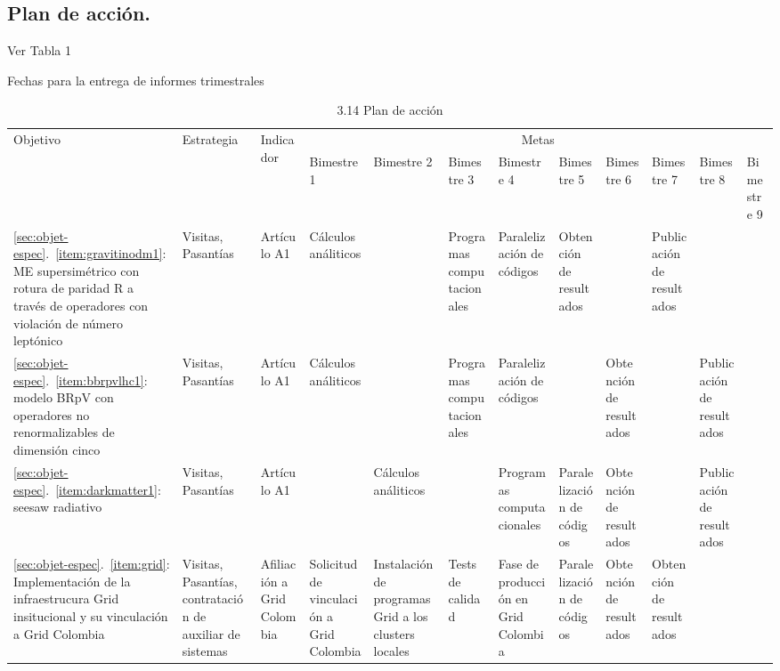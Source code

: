 \subsection{Plan de acción.}
Ver Tabla 1
\begin{evaluacion}
  Fechas para la entrega de informes trimestrales
\end{evaluacion}
\begin{sidewaystable}[htdp]
\footnotesize
\caption{3.14 Plan de acción}  %
\centering
\begin{tabular}{|p{2cm}|p{1.7cm}|p{1.45cm}|p{1.45cm}|p{1.45cm}|p{1.45cm}|p{1.45cm}|p{1.45cm}|p{1.45cm}|p{1.45cm}|p{1.45cm}|p{1.45cm}|}\hline
  \multirow{2}{*}{Objetivo} & \multirow{2}{*}{Estrategia} & \multirow{2}{*}{Indicador}  & \multicolumn{9}{|c|}{Metas}\\
\cline{4-12} 
& & & Bimestre 1 &Bimestre 2 & Bimestre 3& Bimestre 4& Bimestre 5& Bimestre 6& Bimestre 7& Bimestre 8& Bimestre 9\\\hline 
\ref{sec:objet-espec}.~\ref{item:gravitinodm1}: ME supersimétrico con
  rotura de paridad R a través de operadores con violación de número
  leptónico&Visitas, Pasantías&Artículo A1&Cálculos análiticos&&Programas computacionales&Pa\-ra\-le\-li\-za\-ción de códigos&Obtención de resultados&&Publicación de resultados&&\\\hline
\ref{sec:objet-espec}.~\ref{item:bbrpvlhc1}: modelo BRpV con operadores no renormalizables de dimensión cinco&Visitas, Pasantías&Artículo A1&Cálculos análiticos&&Programas computacionales&Pa\-ra\-le\-li\-za\-ción de códigos&&Obtención de resultados&&Publicación de resultados&\\\hline
\ref{sec:objet-espec}.~\ref{item:darkmatter1}: seesaw radiativo&Visitas, Pasantías&Artículo A1&&Cálculos análiticos&&Programas computacionales&Pa\-ra\-le\-li\-za\-ción de códigos&Obtención de resultados&&Publicación de resultados&\\\hline
\ref{sec:objet-espec}.~\ref{item:grid}: Implementación de la infraestrucura Grid insitucional y su vinculación a Grid Colombia&Visitas, Pasantías, contratación de auxiliar de sistemas&Afiliación a Grid Colombia&Solicitud de vinculación a Grid Colombia&Instalación de programas Grid a los clusters locales&Tests de calidad&Fase de producción en Grid Colombia&Pa\-ra\-le\-li\-za\-ción de códigos&Obtención de resultados&Obtención de resultados&&\\\hline
\end{tabular}
\label{tab:LPer}
\end{sidewaystable}


